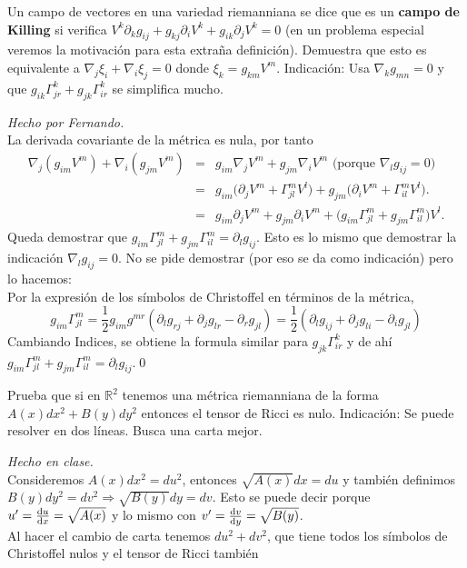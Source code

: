\begin{problem}[10] Un campo de vectores en una variedad riemanniana se dice que es un \textbf{campo de Killing} si verifica $V^k\partial_k g_{ij}+g_{kj}\partial_i V^k+ g_{ik}\partial_jV^k=0$ (en un problema especial veremos la motivación para esta extraña definición). 
	Demuestra que esto es equivalente a  
	$\nabla_j \xi_i+\nabla_i \xi_j=0$ donde $\xi_k=g_{km}V^m$.
	Indicación:  
	Usa $\nabla_k g_{mn}=0$ y que
	$g_{ik}\Gamma_{jr}^k+g_{jk}\Gamma_{ir}^k$ se simplifica mucho. 
	
	\solution\textit{Hecho por Fernando.}\\ La derivada covariante de la métrica es nula, por tanto
	\begin{eqnarray*}
		\nabla_j(g_{im}V^m)
		+
		\nabla_i(g_{jm}V^m)
		&=&
		g_{im}\nabla_j V^m 
		+
		g_{jm}\nabla_i V^m \text{ (porque }\nabla_lg_{ij}=0 )
		\\
		&=&
		g_{im}\big( \partial_j V^m+ \Gamma_{jl}^mV^l) 
		+
		g_{jm}\big( \partial_i V^m+ \Gamma_{il}^mV^l).
		\\
		&=&
		g_{im}\partial_j V^m+g_{jm} \partial_i V^m  
		+\big( g_{im}\Gamma_{jl}^m  + g_{jm}\Gamma_{il}^m)V^l.
	\end{eqnarray*}
	Queda demostrar que $g_{im}\Gamma^m_{jl}+g_{jm}\Gamma^m_{il}=\partial_lg_{ij}$. Esto es lo mismo que demostrar la indicación $\nabla_lg_{ij}=0$. No se pide demostrar (por eso se da como indicación) pero lo hacemos:\\
	Por la expresión de los símbolos de Christoffel en términos de la métrica,
	\[
	g_{im}\Gamma_{jl}^m
	=
	\frac{1}{2}g_{im}g^{mr}
	(\partial_l g_{rj}+\partial_j g_{lr}-\partial_r g_{jl})
	=
	\frac{1}{2}
	(\partial_l g_{ij}+\partial_j g_{li}-\partial_i g_{jl})
	\]
	Cambiando Indices, se obtiene la formula similar para 
	$g_{jk}\Gamma_{ir}^k$ y de ahí $g_{im}\Gamma_{jl}^m  + g_{jm}\Gamma_{il}^m=\partial_l g_{ij}$.\qed
	
	
\end{problem}
\begin{problem}[11] Prueba que si en $\mathbb{R}^2$ tenemos una métrica riemanniana de la forma
	$A(x)dx^2+B(y)dy^2$
	entonces el tensor de Ricci es nulo. {\sf Indicación:} Se puede resolver en dos líneas. Busca una carta mejor. 
	
	\solution\textit{Hecho en clase.}\\ Consideremos $A(x)dx^2=du^2$, entonces $\sqrt{A(x)}dx=du$ y también definimos $B(y)dy^2=dv^2\Rightarrow\sqrt{B(y)}dy=dv$. Esto se puede decir porque $u'=\dv{u}{x}=\sqrt{A(x)}$ y lo mismo con $v'=\dv{v}{y}=\sqrt{B(y)}$.\\
	
	Al hacer el cambio de carta tenemos $du^2+dv^2$, que tiene todos los símbolos de Christoffel nulos y el tensor de Ricci también
\end{problem}
